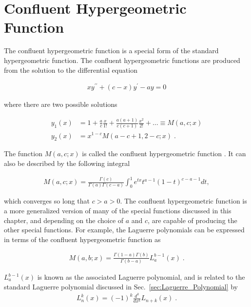         \section{Confluent Hypergeometric Function} \label{sec:Confluent_Hypergeometric_Function}
        The confluent hypergeometric function is a special form of the standard hypergeometric function. The confluent hypergeometric functions are produced from the solution to the differential equation 

        \begin{align}
            xy^{\prime \prime} + (c - x)y^\prime - ay = 0
        \end{align}

        \noindent where there are two possible solutions 

        \begin{align}
            y_1(x) &= 1 + \frac{a}{c} \frac{x}{1!} + \frac{a(a+1)}{c(c+1)}\frac{x^2}{2!} + \dots \equiv M(a, c ;x)\\
            y_2(x) &= x^{1-c}M(a-c + 1, 2 - c; x)\;.
        \end{align}

        \noindent The function $M(a, c;x)$ is called the confluent hypergeometric function \cite{Riley_Hobson_Bence_2006}. It can also be described by the following integral 

        \begin{align}
            M(a, c; x) = \frac{\Gamma(c)}{\Gamma(a)\Gamma(c - a)} \int_0^1 e^{tx} t^{a-1} (1 - t)^{c - a - 1} dt,
        \end{align}

        \noindent which converges so long that $c > a > 0$. The confluent hypergeometric function is a more generalized version of many of the special functions discussed in this chapter, and depending on the choice of $a$ and $c$, are capable of producing the other special functions. For example, the Laguerre polynomials can be expressed in terms of the confluent hypergeometric function as 

        \begin{align}
            M(a, b; x) = \frac{\Gamma(1 - a) \Gamma(b)}{\Gamma(b - a)} L_a^{b-1}(x)\;. \label{eq:confluent-hypergeometric}
        \end{align}

        \noindent $L_a^{b-1}(x)$ is known as the associated Laguerre polynomial, and is related to the standard Laguerre polynomial discussed in Sec.~\ref{sec:Laguerre_Polynomial} by 
        \begin{align}
            L_n^k(x) = (-1)^k \frac{d^k}{dx^k} L_{n+k}(x)\;.
        \end{align}

